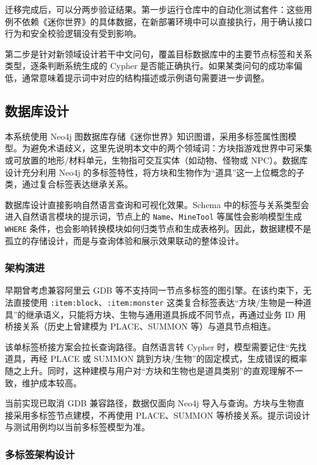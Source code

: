 \documentclass[12pt,a4paper]{article}
\begin{document}
迁移完成后，可以分两步验证结果。第一步运行仓库中的自动化测试套件：这些用例不依赖《迷你世界》的具体数据，在新部署环境中可以直接执行，用于确认接口行为和安全校验逻辑没有受到影响。

第二步是针对新领域设计若干中文问句，覆盖目标数据库中的主要节点标签和关系类型，逐条判断系统生成的 Cypher 是否能正确执行。如果某类问句的成功率偏低，通常意味着提示词中对应的结构描述或示例语句需要进一步调整。

\subsection{数据库设计}
\label{subsec:db-design}

本系统使用 Neo4j 图数据库存储《迷你世界》知识图谱，采用多标签属性图模型。为避免术语歧义，这里先说明本文中的两个领域词：方块指游戏世界中可采集或可放置的地形/材料单元，生物指可交互实体（如动物、怪物或 NPC）。数据库设计充分利用 Neo4j 的多标签特性，将方块和生物作为“道具”这一上位概念的子类，通过复合标签表达继承关系。

数据库设计直接影响自然语言查询和可视化效果。Schema 中的标签与关系类型会进入自然语言模块的提示词，节点上的 \texttt{Name}、\texttt{MineTool} 等属性会影响模型生成 \texttt{WHERE} 条件，也会影响转换模块如何归类节点和生成表格列。因此，数据建模不是孤立的存储设计，而是与查询体验和展示效果联动的整体设计。

\subsubsection{架构演进}

早期曾考虑兼容阿里云 GDB 等不支持同一节点多标签的图引擎。在该约束下，无法直接使用 \texttt{:item:block}、\texttt{:item:monster} 这类复合标签表达“方块/生物是一种道具”的继承语义，只能将方块、生物与通用道具拆成不同节点，再通过业务 ID 用桥接关系（历史上曾建模为 PLACE、SUMMON 等）与道具节点相连。

该单标签桥接方案会拉长查询路径。自然语言转 Cypher 时，模型需要记住“先找道具，再经 PLACE 或 SUMMON 跳到方块/生物”的固定模式，生成错误的概率随之上升。同时，这种建模与用户对“方块和生物也是道具类别”的直观理解不一致，维护成本较高。

当前实现已取消 GDB 兼容路径，数据仅面向 Neo4j 导入与查询。方块与生物直接采用多标签节点建模，不再使用 PLACE、SUMMON 等桥接关系。提示词设计与测试用例均以当前多标签模型为准。

\subsubsection{多标签架构设计}
\end{document}
